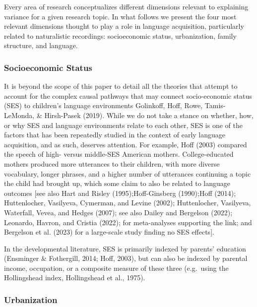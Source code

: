 \documentclass[
  man,floatsintext]{apa6}
\begin{document}
Every area of research conceptualizes different dimensions relevant to explaining variance for a given research topic. In what follows we present the four most relevant dimensions thought to play a role in language acquisition, particularly related to naturalistic recordings: socioeconomic status, urbanization, family structure, and language.

\subsubsection{Socioeconomic Status}\label{socioeconomic-status}

It is beyond the scope of this paper to detail all the theories that attempt to account for the complex causal pathways that may connect socio-economic status (SES) to children's language environments Golinkoff, Hoff, Rowe, Tamis-LeMonda, \& Hirsh-Pasek (2019). While we do not take a stance on whether, how, or why SES and language environments relate to each other, SES is one of the factors that has been repeatedly studied in the context of early language acquisition, and as such, deserves attention. For example, Hoff (2003) compared the speech of high- versus middle-SES American mothers. College-educated mothers produced more utterances to their children, with more diverse vocabulary, longer phrases, and a higher number of utterances continuing a topic the child had brought up, which some claim to also be related to language outcomes {[}see also Hart and Risley (1995);Hoff-Ginsberg (1990);Hoff (2014); Huttenlocher, Vasilyeva, Cymerman, and Levine (2002); Huttenlocher, Vasilyeva, Waterfall, Vevea, and Hedges (2007); see also Dailey and Bergelson (2022); Leonardo, Havron, and Cristia (2022); for meta-analyses supporting the link; and Bergelson et al. (2023) for a large-scale study finding no SES effects{]}.

In the developmental literature, SES is primarily indexed by parents' education (Ensminger \& Fothergill, 2014; Hoff, 2003), but can also be indexed by parental income, occupation, or a composite measure of these three (e.g.~using the Hollingshead index, Hollingshead et al., 1975).

\subsubsection{Urbanization}\label{urbanization}
\end{document}
